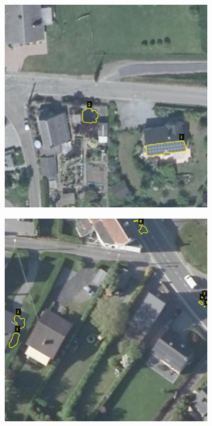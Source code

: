 \documentclass[a4paper, 12pt]{article}
\begin{document}
\begin{figure}[h]
\begin{subfigure}{0.31\textwidth}
		\vspace{0em}
	\end{subfigure}
	\begin{subfigure}{0.31\textwidth}
		\centering
		\includegraphics[width=\textwidth]{resources/jpg/609591_532657.jpg}
		\vspace{0em}
	\end{subfigure}
	\hspace{0.5em}
	\begin{subfigure}{0.31\textwidth}
		\centering
		\includegraphics[width=\textwidth]{resources/jpg/609601_533193.jpg}

\end{subfigure}
\end{figure}
\end{document}
